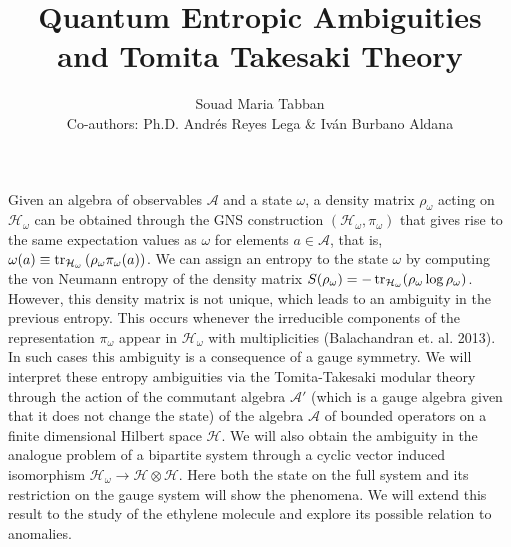 \documentclass{article}
\title{Quantum Entropic Ambiguities and Tomita Takesaki Theory}
\author{Souad Maria Tabban\\Co-authors: Ph.D. Andr\'es Reyes Lega \& Iv\'an Burbano Aldana
}
\begin{document}
\maketitle

Given an algebra of observables $\mathcal{A}$ and a state $\omega$, a density matrix $\rho_\omega$ acting on  $\mathcal H_\omega$ can be  
obtained through the GNS construction $(\mathcal{H}_\omega,\pi_\omega)$ that gives rise to the same expectation values as $\omega$ for elements $a \in
\mathcal{A}$, that is, $\omega(a)\equiv\tr_{\mathcal{H}_\omega}\left(\rho_\omega\pi_\omega(a)\right)$. We can assign an entropy to the state $\omega$
by computing the von Neumann entropy of the density matrix $S(\rho_\omega)=-\tr_{\mathcal{H}_\omega}(\rho_\omega\log\rho_\omega)$. However, this density matrix is not unique, which leads to an ambiguity in the previous entropy. This occurs whenever the irreducible
components of the representation $\pi_\omega$ appear in  $\mathcal{H}_\omega$ with multiplicities (Balachandran et. al. 2013). In such cases this
ambiguity is a consequence of a gauge symmetry. We will interpret these entropy ambiguities via the Tomita-Takesaki modular theory through the action of the commutant algebra $\mathcal{A}'$ (which is a gauge
algebra given that it does not change the state) of the algebra $\mathcal{A}$ of bounded operators on a finite dimensional Hilbert space $\mathcal{H}$.
We will also obtain the ambiguity in the analogue problem of a
bipartite system through a cyclic vector induced isomorphism $\mathcal{H}_\omega\rightarrow\mathcal{H}\otimes\mathcal{H} $.  Here both the state on the full system and its restriction on the gauge system will show the phenomena. We will extend this result to the study of the ethylene molecule and explore its possible relation to anomalies.
\end{document}
